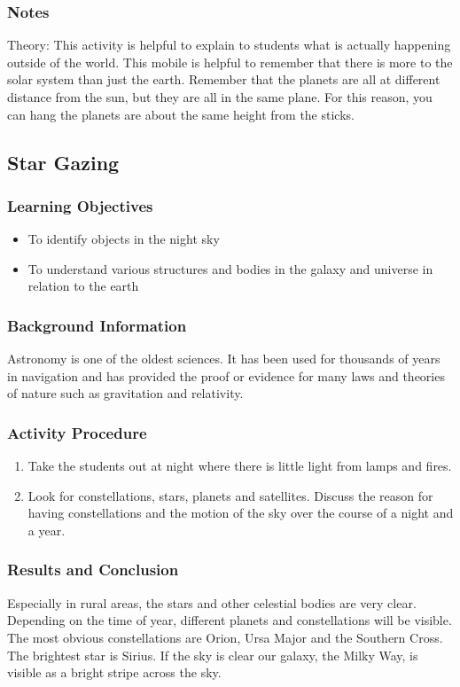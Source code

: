 \subsubsection*{Notes}
Theory: This activity is helpful to explain to students what is actually
happening outside of the world.  This mobile is helpful to remember that there is
more to the solar system than just the earth.  Remember that the planets are all at different distance from the sun, but they are all in the same plane.  For this reason, you can hang the planets are about the same height from the sticks.

\subsection{Star Gazing}

\subsubsection*{Learning Objectives}
\begin{itemize}
\item{To identify objects in the night sky}
\item{To understand various structures and bodies in the galaxy and universe in relation to the earth}
\end{itemize}

\subsubsection*{Background Information}
Astronomy is one of the oldest sciences.  It has been used for thousands of years in navigation and has provided the proof or evidence for many laws and theories of nature such as gravitation and relativity.

\subsubsection*{Activity Procedure}
\begin{enumerate}
\item{Take the students out at night where there is little light from lamps and fires.}
\item{Look for constellations, stars, planets and satellites. Discuss the reason for having constellations and the motion of the sky over the course of a night and a year.}
\end{enumerate}

\subsubsection*{Results and Conclusion}
Especially in rural areas, the stars and other celestial bodies are very clear.  Depending on the time of year, different planets and constellations will be visible.  The most obvious constellations are Orion, Ursa Major and the Southern Cross.  The brightest star is Sirius.  If the sky is clear our galaxy, the Milky Way, is visible as a bright stripe across the sky.

